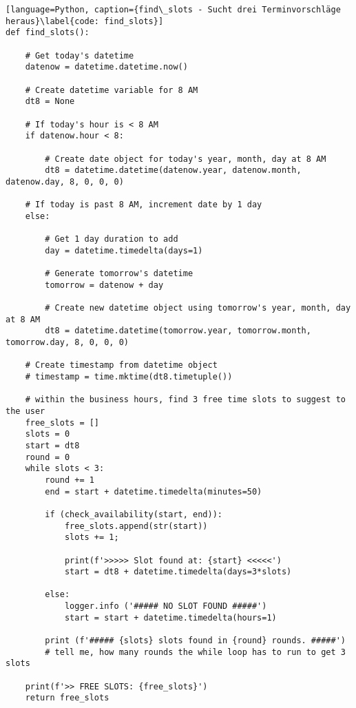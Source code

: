                 \begin{lstlisting}[language=Python, caption={find\_slots - Sucht drei Terminvorschläge heraus}\label{code: find_slots}]
def find_slots():

    # Get today's datetime
    datenow = datetime.datetime.now()

    # Create datetime variable for 8 AM
    dt8 = None

    # If today's hour is < 8 AM
    if datenow.hour < 8:

        # Create date object for today's year, month, day at 8 AM
        dt8 = datetime.datetime(datenow.year, datenow.month, datenow.day, 8, 0, 0, 0)

    # If today is past 8 AM, increment date by 1 day
    else:

        # Get 1 day duration to add
        day = datetime.timedelta(days=1)

        # Generate tomorrow's datetime
        tomorrow = datenow + day

        # Create new datetime object using tomorrow's year, month, day at 8 AM
        dt8 = datetime.datetime(tomorrow.year, tomorrow.month, tomorrow.day, 8, 0, 0, 0)

    # Create timestamp from datetime object
    # timestamp = time.mktime(dt8.timetuple())
    
    # within the business hours, find 3 free time slots to suggest to the user
    free_slots = []
    slots = 0
    start = dt8
    round = 0
    while slots < 3:
        round += 1
        end = start + datetime.timedelta(minutes=50)
        
        if (check_availability(start, end)): 
            free_slots.append(str(start))
            slots += 1;

            print(f'>>>>> Slot found at: {start} <<<<<')
            start = dt8 + datetime.timedelta(days=3*slots)

        else: 
            logger.info ('##### NO SLOT FOUND #####')
            start = start + datetime.timedelta(hours=1)
        
        print (f'##### {slots} slots found in {round} rounds. #####') 
        # tell me, how many rounds the while loop has to run to get 3 slots

    print(f'>> FREE SLOTS: {free_slots}')
    return free_slots
                \end{lstlisting}


